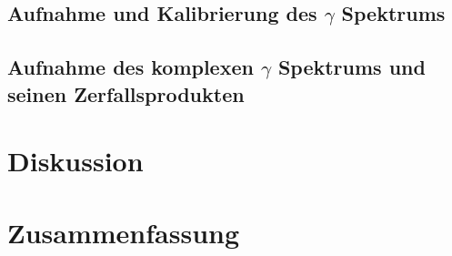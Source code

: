 \documentclass[12pt,english,ngerman]{scrartcl}
\begin{document}
\subsection{Aufnahme und Kalibrierung des \texorpdfstring{$\gamma$}{gamma} Spektrums}


\subsection{Aufnahme des komplexen \texorpdfstring{$\gamma$}{gamma} Spektrums und seinen Zerfallsprodukten}






\section*{Diskussion}\label{sec:diskussion}



\section{Zusammenfassung}



\newpage

\printbibliography
\listoffigures
\listoftables
\end{document}
